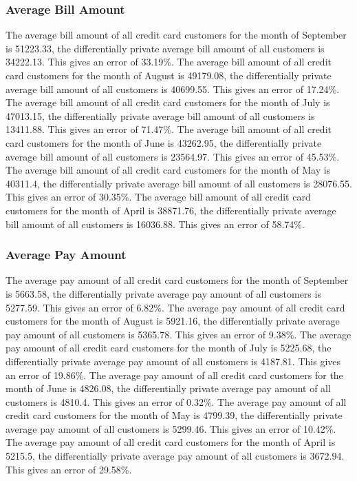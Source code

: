 \documentclass{article}%
\begin{document}
%
\subsubsection{Average Bill Amount}%
\label{ssubsec:AverageBillAmount}%
The average bill amount of all credit card customers for the month of September is 51223.33, the differentially private average bill amount of all customers is 34222.13. This gives an error of 33.19\%.%
The average bill amount of all credit card customers for the month of August is 49179.08, the differentially private average bill amount of all customers is 40699.55. This gives an error of 17.24\%.%
The average bill amount of all credit card customers for the month of July is 47013.15, the differentially private average bill amount of all customers is 13411.88. This gives an error of 71.47\%.%
The average bill amount of all credit card customers for the month of June is 43262.95, the differentially private average bill amount of all customers is 23564.97. This gives an error of 45.53\%.%
The average bill amount of all credit card customers for the month of May is 40311.4, the differentially private average bill amount of all customers is 28076.55. This gives an error of 30.35\%.%
The average bill amount of all credit card customers for the month of April is 38871.76, the differentially private average bill amount of all customers is 16036.88. This gives an error of 58.74\%.

%
\subsubsection{Average Pay Amount}%
\label{ssubsec:AveragePayAmount}%
The average pay amount of all credit card customers for the month of September is 5663.58, the differentially private average pay amount of all customers is 5277.59. This gives an error of 6.82\%.%
The average pay amount of all credit card customers for the month of August is 5921.16, the differentially private average pay amount of all customers is 5365.78. This gives an error of 9.38\%.%
The average pay amount of all credit card customers for the month of July is 5225.68, the differentially private average pay amount of all customers is 4187.81. This gives an error of 19.86\%.%
The average pay amount of all credit card customers for the month of June is 4826.08, the differentially private average pay amount of all customers is 4810.4. This gives an error of 0.32\%.%
The average pay amount of all credit card customers for the month of May is 4799.39, the differentially private average pay amount of all customers is 5299.46. This gives an error of 10.42\%.%
The average pay amount of all credit card customers for the month of April is 5215.5, the differentially private average pay amount of all customers is 3672.94. This gives an error of 29.58\%.
\end{document}

